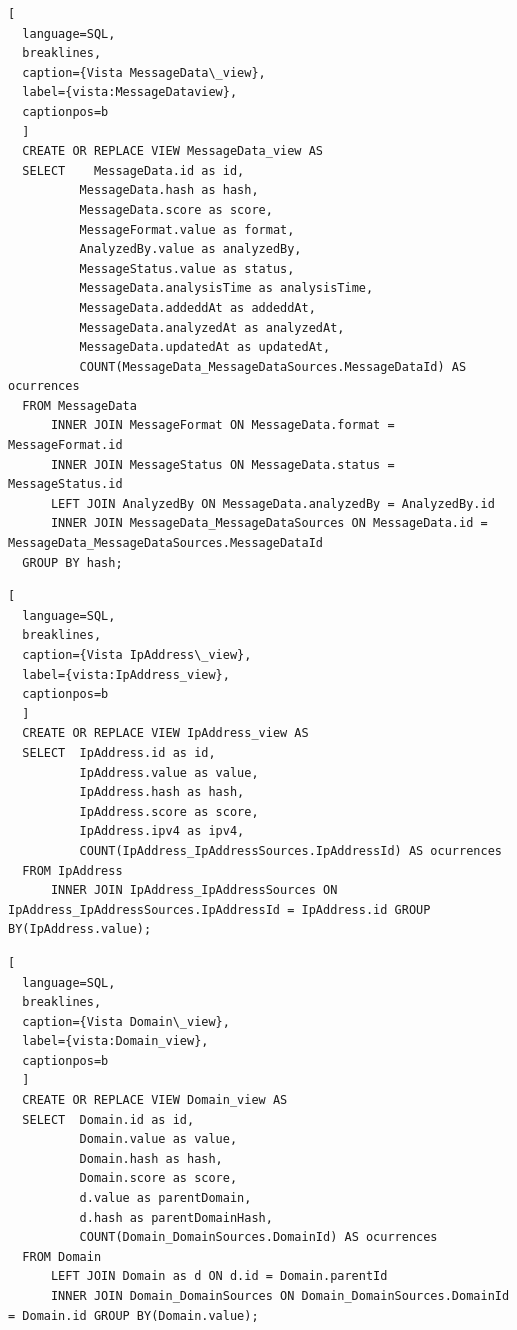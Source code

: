 \begin{lstlisting}[
  language=SQL,
  breaklines, 
  caption={Vista MessageData\_view}, 
  label={vista:MessageDataview}, 
  captionpos=b
  ]
  CREATE OR REPLACE VIEW MessageData_view AS 
  SELECT	MessageData.id as id, 
          MessageData.hash as hash, 
          MessageData.score as score, 
          MessageFormat.value as format, 
          AnalyzedBy.value as analyzedBy, 
          MessageStatus.value as status, 
          MessageData.analysisTime as analysisTime, 
          MessageData.addeddAt as addeddAt, 
          MessageData.analyzedAt as analyzedAt, 
          MessageData.updatedAt as updatedAt,
          COUNT(MessageData_MessageDataSources.MessageDataId) AS ocurrences 
  FROM MessageData 
      INNER JOIN MessageFormat ON MessageData.format = MessageFormat.id
      INNER JOIN MessageStatus ON MessageData.status = MessageStatus.id
      LEFT JOIN AnalyzedBy ON MessageData.analyzedBy = AnalyzedBy.id
      INNER JOIN MessageData_MessageDataSources ON MessageData.id = MessageData_MessageDataSources.MessageDataId
  GROUP BY hash;
\end{lstlisting}

\begin{lstlisting}[
  language=SQL,
  breaklines, 
  caption={Vista IpAddress\_view}, 
  label={vista:IpAddress_view}, 
  captionpos=b
  ]
  CREATE OR REPLACE VIEW IpAddress_view AS 
  SELECT  IpAddress.id as id, 
          IpAddress.value as value, 
          IpAddress.hash as hash, 
          IpAddress.score as score, 
          IpAddress.ipv4 as ipv4, 
          COUNT(IpAddress_IpAddressSources.IpAddressId) AS ocurrences  
  FROM IpAddress
      INNER JOIN IpAddress_IpAddressSources ON IpAddress_IpAddressSources.IpAddressId = IpAddress.id GROUP BY(IpAddress.value);

\end{lstlisting}

\begin{lstlisting}[
  language=SQL,
  breaklines, 
  caption={Vista Domain\_view}, 
  label={vista:Domain_view}, 
  captionpos=b
  ]
  CREATE OR REPLACE VIEW Domain_view AS 
  SELECT  Domain.id as id, 
          Domain.value as value, 
          Domain.hash as hash, 
          Domain.score as score, 
          d.value as parentDomain,
          d.hash as parentDomainHash,
          COUNT(Domain_DomainSources.DomainId) AS ocurrences  
  FROM Domain
      LEFT JOIN Domain as d ON d.id = Domain.parentId
      INNER JOIN Domain_DomainSources ON Domain_DomainSources.DomainId = Domain.id GROUP BY(Domain.value);

\end{lstlisting}

